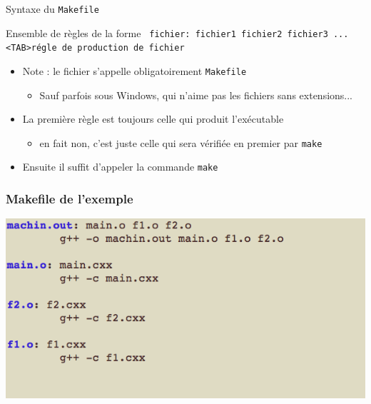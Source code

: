 \begin{frame}{Syntaxe du \texttt{Makefile}}
\begin{block}{Ensemble de règles de la forme}
\texttt{  fichier: fichier1 fichier2 fichier3 ... \\
  	<TAB>régle de production de fichier \\
}\end{block}
\begin{itemize}
\item Note : le fichier s'appelle obligatoirement \texttt{Makefile}
\begin{itemize}
\item Sauf parfois sous Windows, qui n'aime pas les fichiers sans extensions...
\end{itemize}
\item La première règle est toujours celle qui produit l'exécutable
\begin{itemize}
	\item en fait non, c'est juste celle qui sera vérifiée en premier par \texttt{make}
\end{itemize}
\item Ensuite il suffit d'appeler la commande \texttt{make}
\end{itemize}
\end{frame}

\begin{frame}[fragile]
  \frametitle{Makefile de l'exemple}
        \begin{center}
      \includegraphics[scale=.4]{fig/makefile.png}
    \end{center}
\end{frame}
